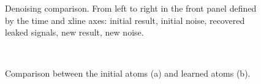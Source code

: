 {\begin{figure}[htb!]
\centering
{}
\caption{Denoising comparison. From left to right in the front panel defined by the time and xline axes: initial result, initial noise, recovered leaked signals, new result, new noise.}
\label{fig:t-comp}
\end{figure}

\begin{figure}[htb!]
\centering
{}\\
\caption{Comparison between the initial atoms (a) and learned atoms (b). }
\label{fig:t-atoms1,t-atoms2}
\end{figure}

\begin{figure}[htb!]
\centering


\end{figure}}
